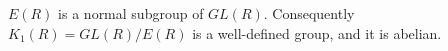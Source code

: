 $E(R)$ is a normal subgroup of $GL(R)$. Consequently $K_1(R) = GL(R)/E(R)$ is a well-defined group, and it is abelian.
